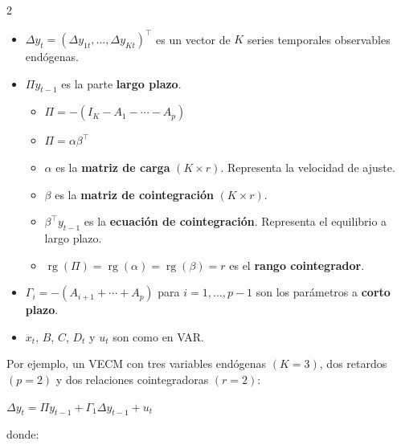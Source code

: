 \documentclass[10pt, a4paper, landscape]{article}
\DeclareMathOperator{\rk}{rg}
\begin{document}
\begin{multicols}{2}
\begin{itemize}[leftmargin=*]
	\item \( \Delta y_{t} = (\Delta y_{1t}, \ldots, \Delta y_{Kt})^{\top} \) es un vector de \( K \) series temporales observables endógenas.
	\item \( \Pi y_{t - 1} \) es la parte \textbf{largo plazo}.
	\begin{itemize}[leftmargin=*, label={\( \diamond \)}]
		\item \( \Pi = - (I_{K} - A_{1} - \cdots - A_{p}) \)
		\item \( \Pi = \alpha \beta^{\top} \)
		\item \( \alpha \) es la \textbf{matriz de carga} \( (K \times r) \). Representa la velocidad de ajuste.
		\item \( \beta \) es la \textbf{matriz de cointegración} \( (K \times r) \).
		\item \( \beta^{\top} y_{t - 1} \) es la \textbf{ecuación de cointegración}. Representa el equilibrio a largo plazo.
		\item \( \rk(\Pi) = \rk(\alpha) = \rk(\beta) = r \) es el \textbf{rango cointegrador}.
	\end{itemize}
	\item \( \Gamma_{i} = - (A_{i + 1} + \cdots + A_{p}) \) para \( i = 1, \ldots, p - 1 \) son los parámetros a \textbf{corto plazo}.
	\item \( x_{t} \), \( B \), \( C \), \( D_{t} \) y \( u_{t} \) son como en VAR.
\end{itemize}

Por ejemplo, un VECM con tres variables endógenas \( (K = 3) \), dos retardos \( (p = 2) \) y dos relaciones cointegradoras \( (r = 2) \):

\begin{center}
	\( \Delta y_{t} = \Pi y_{t - 1} + \Gamma_{1} \Delta y_{t - 1} + u_{t} \)
\end{center}

\quad donde:


\end{multicols}
\end{document}
